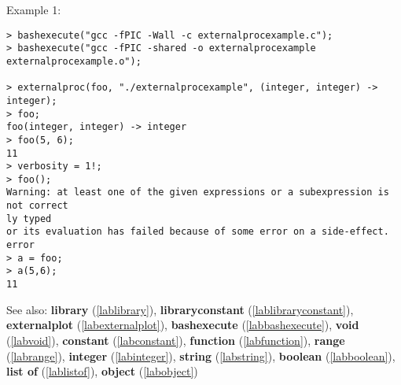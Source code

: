 \noindent Example 1: 
\begin{center}\begin{minipage}{15cm}\begin{Verbatim}[frame=single]
> bashexecute("gcc -fPIC -Wall -c externalprocexample.c");
> bashexecute("gcc -fPIC -shared -o externalprocexample externalprocexample.o");

> externalproc(foo, "./externalprocexample", (integer, integer) -> integer);
> foo;
foo(integer, integer) -> integer
> foo(5, 6);
11
> verbosity = 1!;
> foo();
Warning: at least one of the given expressions or a subexpression is not correct
ly typed
or its evaluation has failed because of some error on a side-effect.
error
> a = foo;
> a(5,6);
11
\end{Verbatim}
\end{minipage}\end{center}
See also: \textbf{library} (\ref{lablibrary}), \textbf{libraryconstant} (\ref{lablibraryconstant}), \textbf{externalplot} (\ref{labexternalplot}), \textbf{bashexecute} (\ref{labbashexecute}), \textbf{void} (\ref{labvoid}), \textbf{constant} (\ref{labconstant}), \textbf{function} (\ref{labfunction}), \textbf{range} (\ref{labrange}), \textbf{integer} (\ref{labinteger}), \textbf{string} (\ref{labstring}), \textbf{boolean} (\ref{labboolean}), \textbf{list of} (\ref{lablistof}), \textbf{object} (\ref{labobject})
